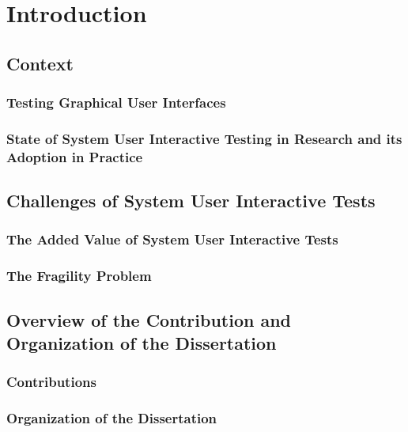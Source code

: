\chapter{Introduction}
\section{Context}
\subsection{Testing Graphical User Interfaces}
\subsection{State of System User Interactive Testing in Research and its Adoption in Practice}
\section{Challenges of System User Interactive Tests}

\subsection{The Added Value of System User Interactive Tests}

\subsection{The Fragility Problem}

\section{Overview of the Contribution and Organization of the Dissertation}
\subsection{Contributions}
\subsection{Organization of the Dissertation}